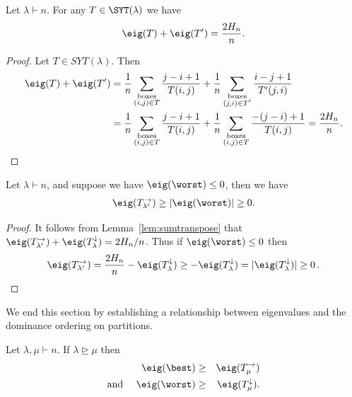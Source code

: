 \documentclass[11pt]{report}
\begin{document}
\begin{lemma}
	\label{lem:sumtranspose}
	Let $\lambda\vdash n$.
	For any $T \in \SYT(\lambda)$ we have 
	\[\eig(T) + \eig(T^{\prime}) = \frac{2H_{n}}{n}.\]
\end{lemma}

\begin{proof}
	Let $T\in SYT(\lambda)$. Then
	\begin{align*} \eig(T) +\eig(T')&= \frac 1n \sum_{\substack{\textnormal{boxes}\\ (i,j)\in T}} 
	\frac{j-i+1}{T(i,j)} + \frac 1n \sum_{\substack{\textnormal{boxes}\\ (j,i)\in T'}} 
	\frac{i-j+1}{T'(j,i)} \\
	&= \frac 1n \sum_{\substack{\textnormal{boxes}\\ (i,j)\in T}} 
	\frac{j-i+1}{T(i,j)} + \frac 1n \sum_{\substack{\textnormal{boxes}\\ (i,j)\in T}} 
	\frac{-(j-i)+1}{T(i,j)} = \frac {2H_n}{n}. \qedhere
	\end{align*}
	
	
	
	
	
	
\end{proof}

\begin{corollary}
	\label{flip}
	Let $\lambda \vdash n$, and suppose we 
	have 
	$\eig(\worst) \leq 0$, then we 
	have 
	\begin{eqnarray}
	\label{case2}
	\eig(T_{\lambda^{\prime}}^{\rightarrow}) \geq 
	|\eig(\worst)| \geq  0.
	\end{eqnarray}
\end{corollary}

\begin{proof}
	It follows from Lemma~\ref{lem:sumtranspose} that $\eig(T_{\lambda'}^\rightarrow) + \eig(T_{\lambda}^\downarrow) = 2H_n/n$. Thus if $\eig(\worst) \leq 0$ then 
	\begin{eqnarray}
	\eig(T_{\lambda'}^\rightarrow) = \frac{2H_n}{n} - 
	\eig(T_{\lambda}^\downarrow) \ge - \eig(T_{\lambda}^\downarrow) = 
	|\eig(T_{\lambda}^\downarrow)| \ge 0\,. \qedhere
	\end{eqnarray}
\end{proof}

We end this section by establishing a relationship between eigenvalues and the dominance ordering on partitions.
\begin{lemma}
	\label{order}
	Let $\lambda, \mu \vdash n$. If $\lambda \trianglerighteq \mu$ then 
	\begin{eqnarray}
	\eig(\best)& \geq & 
	\eig(T_\mu^{\rightarrow}) \label{chpt5:eqn:bestdomdown}\\
	\label{down}
	\text{and }\quad \eig(\worst) & \geq &
	\eig(T_\mu^{\downarrow}). \label{chpt5:eqn:worstdomdown}
	\end{eqnarray}
\end{lemma}
\end{document}

